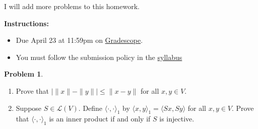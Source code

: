 \documentclass[12pt]{article}
\theoremstyle{definition}
\newtheorem{problem}{Problem}
\begin{document}
\textbf{\Large{}}
    
\vspace{-1.8em}
\hrulefill

{\color{red}I will add more problems to this homework.}

\textbf{Instructions:}
    \begin{itemize}
        \item Due April 23 at 11:59pm on \href{https://www.gradescope.com/courses/709136}{Gradescope}.
        \item You must follow the submission policy in the \href{https://courses.chen.pw/la_s2024/syllabus.html}{syllabus} 
\end{itemize}
   
\vspace{.5em}

\begin{problem}~
    \begin{enumerate}
        \item Prove that $| \|x\| - \|y\| | \leq \|x-y\|$ for all $x,y \in V$.
        \item Suppose $S\in\mathcal{L}(V)$. Define $\langle \cdot ,\cdot \rangle_1$ by $\langle x,y \rangle_1 = \langle Sx,Sy \rangle$ for all $x,y\in V$. Prove that $\langle \cdot ,\cdot \rangle_1$ is an inner product if and only if $S$ is injective.
    \end{enumerate}
\end{problem}
\end{document}
